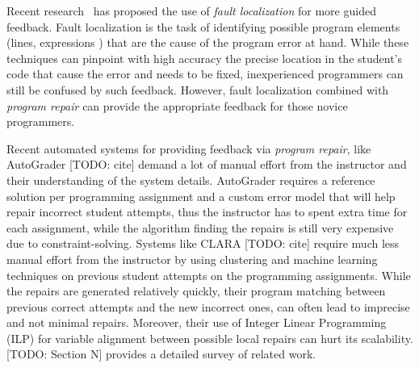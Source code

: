Recent research~\citep[][]{Seidel:2017, Zhang2014-lv} has proposed the use of
\emph{fault localization} for more guided feedback. Fault localization is the
task of identifying possible program elements (\eg lines, expressions \etc) that
are the cause of the program error at hand. While these techniques can pinpoint
with high accuracy the precise location in the student's code that cause the
error and needs to be fixed, inexperienced programmers can still be confused by
such feedback. However, fault localization combined with \emph{program repair}
can provide the appropriate feedback for those novice programmers.

Recent automated systems for providing feedback via \emph{program repair}, like
AutoGrader [TODO: cite] demand a lot of manual effort from the instructor and
their understanding of the system details. AutoGrader requires a reference
solution per programming assignment and a custom error model that will help
repair incorrect student attempts, thus the instructor has to spent extra time
for each assignment, while the algorithm finding the repairs is still very
expensive due to constraint-solving. Systems like CLARA [TODO: cite] require
much less manual effort from the instructor by using clustering and machine
learning techniques on previous student attempts on the programming assignments.
While the repairs are generated relatively quickly, their program matching
between previous correct attempts and the new incorrect ones, can often lead to
imprecise and not minimal repairs. Moreover, their use of Integer Linear
Programming (ILP) for variable alignment between possible local repairs can hurt
its scalability. [TODO: Section N] provides a detailed survey of related work.





